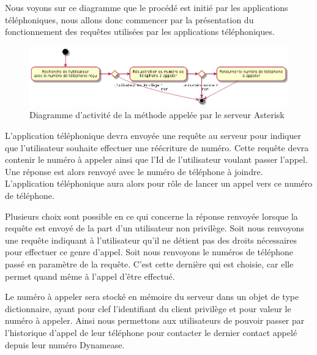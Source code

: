 Nous voyons sur ce diagramme que le procédé est initié par les applications téléphoniques, nous allons donc commencer par la présentation du fonctionnement des requêtes utilisées par les applications téléphoniques.
\newpage

\begin{figure}[!h]
	\centering
	\includegraphics[scale=0.5]{img/activity_rewrite_ast.png}
	\caption{\label{activity_rewrite_ast} Diagramme d'activité de la méthode appelée par le serveur Asterisk}
\end{figure}


L'application téléphonique devra envoyée une requête au serveur pour indiquer que l'utilisateur souhaite effectuer une réécriture de numéro. Cette requête devra contenir le numéro à appeler ainsi que l'Id de l'utilisateur voulant passer l'appel. Une réponse est alors renvoyé avec le numéro de téléphone à joindre. L'application téléphonique aura alors pour rôle de lancer un appel vers ce numéro de téléphone. 

Plusieurs choix sont possible en ce qui concerne la réponse renvoyée lorsque la requête est envoyé de la part d'un utilisateur non privilège. Soit nous renvoyons une requête indiquant à l'utilisateur qu'il ne détient pas des droits nécessaires pour effectuer ce genre d'appel. Soit nous renvoyons le numéros de téléphone passé en paramètre de la requête. C'est cette dernière qui est choisie, car elle permet quand même à l'appel d'être effectué.

Le numéro à appeler sera stocké en mémoire du serveur dans un objet de type dictionnaire, ayant pour clef l'identifiant du client privilège et pour valeur le numéro à appeler. Ainsi nous permettons aux utilisateurs de pouvoir passer par l'historique d'appel de leur téléphone pour contacter le dernier contact appelé depuis leur numéro Dynamease.\\

